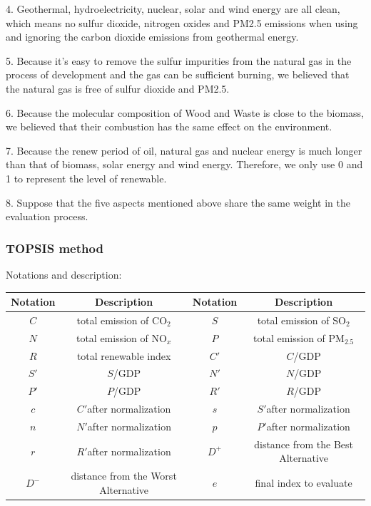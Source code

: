 \documentclass[12pt]{article}
\begin{document}
4. Geothermal, hydroelectricity, nuclear, solar and wind energy are all clean, which means no sulfur dioxide, nitrogen oxides and PM2.5 emissions when using and ignoring the carbon dioxide emissions from geothermal energy.

5. Because it's easy to remove the sulfur impurities from the natural gas in the process of development and the gas can be sufficient burning, we believed that the natural gas is free of sulfur dioxide and PM2.5.

6. Because the molecular composition of Wood and Waste is close to the biomass, we believed that their combustion has the same effect on the environment.

7. Because the renew period of oil, natural gas and nuclear energy is much longer than that of biomass, solar energy and wind energy. Therefore, we only use 0 and 1 to represent the level of renewable.

8. Suppose that the five aspects mentioned above share the same weight in the evaluation process.

\subsubsection{TOPSIS method}

Notations and description:

\begin{table}[h!]\centering\scriptsize
\begin{tabular}{|c|c|c|c| }
\hline
 \textbf{Notation}&\textbf{Description}&\textbf{Notation}&\textbf{Description}\\
 \hline
$C$&total emission of $\mathrm{CO}_{2}$&$S$&total emission of $\mathrm{SO}_{2}$\\
\hline
$N$&total emission of $\mathrm{NO}_{x}$&$P$&total emission of $\mathrm{PM}_{2.5}$\\
\hline
$R$&total renewable index&$C'$&$C$/GDP\\
\hline
$S'$&$S$/GDP&$N'$&$N$/GDP\\
\hline
$P'$&$P$/GDP&$R'$&$R$/GDP\\
\hline
$c$&$C'$after normalization&$s$&$S'$after normalization\\
\hline
$n$&$N'$after normalization&$p$&$P'$after normalization\\
\hline
$r$&$R'$after normalization&$D^{+}$&distance from the Best Alternative\\
\hline
$D^{-}$&distance from the Worst Alternative&$e$&final index to evaluate\\
\hline
\end{tabular}
\end{table}
\end{document}
